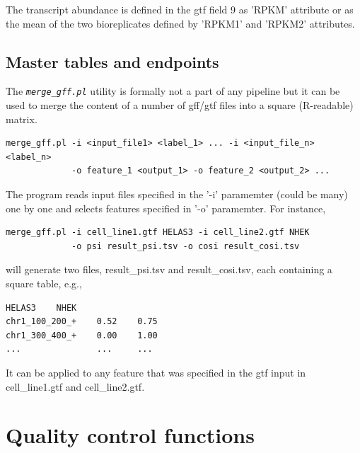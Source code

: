 \documentclass{article}
\newcommand{\prog}[1]{{\tt\em #1}}
\begin{document}
The transcript abundance is defined in the gtf field 9 as 'RPKM' attribute or as the mean of the two bioreplicates defined by
'RPKM1' and 'RPKM2' attributes.


\subsection{Master tables and endpoints}
The \prog{merge\_gff.pl} utility is formally not a part of any pipeline but it can be used to merge the content of a number of gff/gtf 
files into a square (R-readable) matrix.
\begin{verbatim}
merge_gff.pl -i <input_file1> <label_1> ... -i <input_file_n> <label_n>
             -o feature_1 <output_1> -o feature_2 <output_2> ...
\end{verbatim}
The program reads input files specified in the '-i' paramemter (could be many) one by one and selects features specified in '-o' paramemter. For instance,
\begin{verbatim}
merge_gff.pl -i cell_line1.gtf HELAS3 -i cell_line2.gtf NHEK 
             -o psi result_psi.tsv -o cosi result_cosi.tsv
\end{verbatim}
will generate two files, result\_psi.tsv and result\_cosi.tsv, each containing a square table, e.g.,
\begin{verbatim}
HELAS3    NHEK
chr1_100_200_+    0.52    0.75
chr1_300_400_+    0.00    1.00
...               ...     ...
\end{verbatim}
It can be applied to any feature that was specified in the gtf input in cell\_line1.gtf and cell\_line2.gtf.

\section{Quality control functions}
\end{document}
